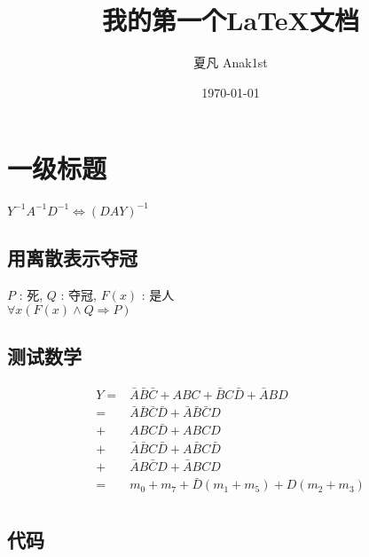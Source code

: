 \documentclass[11pt, a4paper, oneside]{article}
\title{我的第一个\LaTeX 文档}
\author{夏凡 Anak1st}
\date{\today}
\begin{document}
\maketitle

\section{一级标题}

$ Y^{-1} A^{-1} D^{-1} \iff (DAY)^{-1} $

\subsection{用离散表示夺冠}
\begin{center}
    $P$ : 死, $Q$ : 夺冠, $F(x)$ : 是人 \\
    ${\forall}x(F(x) \wedge Q \Rightarrow P)$
\end{center}

\subsection{测试数学}
\begin{center}
    \begin{align}
        Y = & \bar{A} \bar{B} \bar{C} + A B C + \bar{B} C \bar{D} + \bar{A} B D \\
          = & \bar{A} \bar{B} \bar{C} \bar{D} + \bar{A} \bar{B} \bar{C} D \\
          + & A B C \bar{D} + A B C D \\
          + & \bar{A} \bar{B} C \bar{D} + A \bar{B} C \bar{D} \\
          + & \bar{A} B \bar{C} D + \bar{A} B C D \\
          = & m_0 + m_7 + \bar{D} (m_1 + m_5) + D (m_2 + m_3) \\
    \end{align}
\end{center}

\newpage
\subsection{代码}

\end{document}
